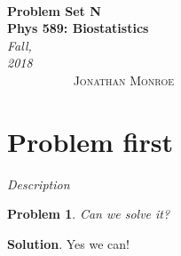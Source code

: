\documentclass[12pt]{article}
\renewcommand{\=}[1]{\stackrel{#1}{=}} %
\newtheorem{p}{Problem}[section]
\theoremstyle{definition}
\newenvironment{s}{%
        \begin{trivlist} \item \textbf{Solution}. }{%
			\end{trivlist}}%
\begin{document}
	
	{\noindent\Huge\bf  \\[0.5\baselineskip] {\selectfont  Problem Set N}         }\\[2\baselineskip] %
	{ {\bf {}\selectfont Phys 589: Biostatistics}\\ {\textit{\selectfont     Fall, 2018}}}~~~~~~~~~~~~~~~~~~~~~~~~~~~~~~~~~~~~~~~~~~~~~~~~~~~~~~~~~~~~~~~~~~~~~~~~~~~~~    {\large \textsc{Jonathan Monroe}} %
	\\[1.4\baselineskip] 
	
	
	
	\section{Problem first}
	\emph{Description}

	
	\begin{p} Can we solve it?
	\end{p}
	\begin{s} Yes we can!
	\end{s}
\end{document}
